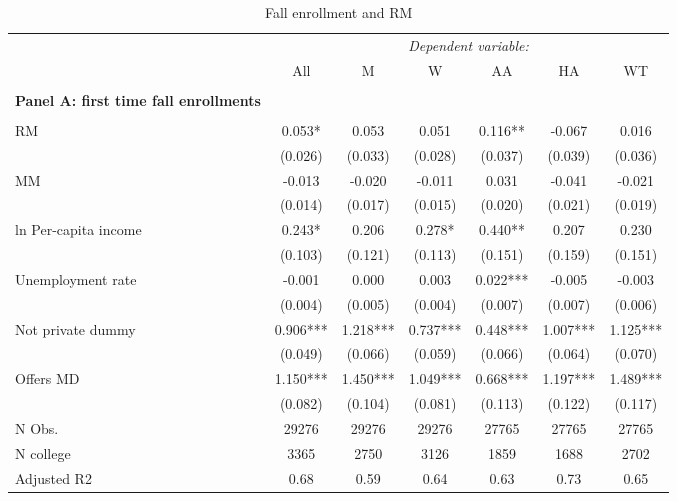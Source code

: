 \documentclass[12pt]{article}%
\begin{document}
\FloatBarrier
\begin{table}[!htbp] \centering 
  \begin{threeparttable}
    \caption{Fall enrollment and RM }
   \label{table:fe}
  \small
\begin{tabular}{@{\extracolsep{-6pt}}lcccccc} 
\toprule
 & \multicolumn{6}{c}{\textit{ Dependent variable:}} \\ 
\cline{2-7} 
& All & M & W & AA & HA & WT \\
\midrule  \\[-1.8ex] 
\textbf{Panel A: first time fall enrollments}\\ \\[-1.8ex] 
RM & 0.053* & 0.053 & 0.051 & 0.116** & -0.067 & 0.016 \\
& (0.026) & (0.033) & (0.028) & (0.037) & (0.039) & (0.036) \\
MM & -0.013 & -0.020 & -0.011 & 0.031 & -0.041 & -0.021 \\
& (0.014) & (0.017) & (0.015) & (0.020) & (0.021) & (0.019) \\
ln Per-capita income & 0.243* & 0.206 & 0.278* & 0.440** & 0.207 &
0.230 \\
& (0.103) & (0.121) & (0.113) & (0.151) & (0.159) & (0.151) \\
Unemployment rate & -0.001 & 0.000 & 0.003 & 0.022*** & -0.005 &
-0.003 \\
& (0.004) & (0.005) & (0.004) & (0.007) & (0.007) & (0.006) \\
Not private dummy & 0.906*** & 1.218*** & 0.737*** & 0.448*** & 1.007***
& 1.125*** \\
& (0.049) & (0.066) & (0.059) & (0.066) & (0.064) & (0.070) \\
Offers MD & 1.150*** & 1.450*** & 1.049*** & 0.668*** & 1.197*** &
1.489*** \\
& (0.082) & (0.104) & (0.081) & (0.113) & (0.122) & (0.117) \\
\hline
N Obs. & 29276 & 29276 & 29276 & 27765 & 27765 & 27765 \\
N college & 3365 & 2750 & 3126 & 1859 & 1688 & 2702 \\
Adjusted R2 & 0.68 & 0.59 & 0.64 & 0.63 & 0.73 & 0.65 \\



\end{tabular}
\end{threeparttable}
\end{table}
\end{document}
